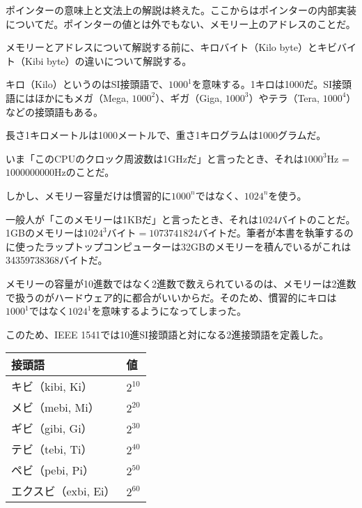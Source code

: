 
ポインターの意味上と文法上の解説は終えた。ここからはポインターの内部実装についてだ。ポインターの値とは外でもない、メモリー上のアドレスのことだ。


メモリーとアドレスについて解説する前に、キロバイト（Kilo byte）とキビバイト（Kibi byte）の違いについて解説する。

キロ（Kilo）というのはSI接頭語で、\(1000^1\)を意味する。1キロは1000だ。SI接頭語にはほかにもメガ（Mega, \(1000^2\)）、ギガ（Giga, \(1000^3\)）やテラ（Tera, \(1000^4\)）などの接頭語もある。

長さ1キロメートルは1000メートルで、重さ1キログラムは1000グラムだ。

いま「このCPUのクロック周波数は1GHzだ」と言ったとき、それは\(1000^3\)Hz = \(1000000000\)Hzのことだ。

しかし、メモリー容量だけは慣習的に\(1000^n\)ではなく、\(1024^n\)を使う。

一般人が「このメモリーは1KBだ」と言ったとき、それは1024バイトのことだ。1GBのメモリーは\(1024^3 バイト = 1073741824 バイト\)だ。筆者が本書を執筆するのに使ったラップトップコンピューターは32GBのメモリーを積んでいるがこれは34359738368バイトだ。

メモリーの容量が10進数ではなく2進数で数えられているのは、メモリーは2進数で扱うのがハードウェア的に都合がいいからだ。そのため、慣習的にキロは\(1000^1\)ではなく\(1024^1\)を意味するようになってしまった。

このため、IEEE 1541では10進SI接頭語と対になる2進接頭語を定義した。

\ifTombow\pagebreak\fi
\begin{small}
\begin{longtable}[]{@{\,\,}ll@{\,\,}}
\hline%
\textsf{接頭語} & \textsf{値}\tabularnewline
\hline%
\endhead
キビ（kibi, Ki） & \(2^{10}\)\tabularnewline
メビ（mebi, Mi） & \(2^{20}\)\tabularnewline
ギビ（gibi, Gi） & \(2^{30}\)\tabularnewline
テビ（tebi, Ti） & \(2^{40}\)\tabularnewline
ペビ（pebi, Pi） & \(2^{50}\)\tabularnewline
エクスビ（exbi, Ei） & \(2^{60}\)\tabularnewline
\hline%
\end{longtable}
\end{small}

